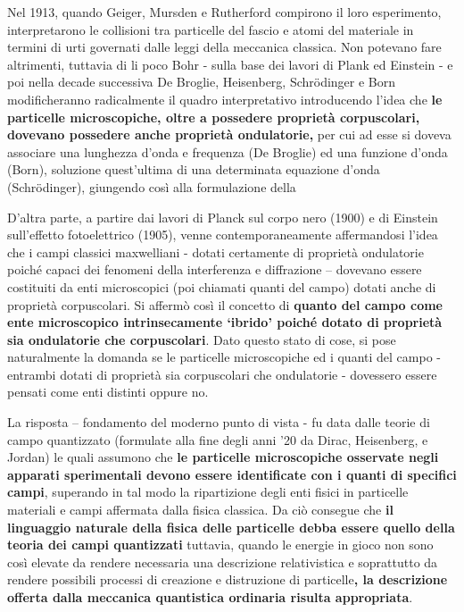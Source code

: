 Nel 1913, quando Geiger, Mursden e Rutherford compirono il loro
esperimento, interpretarono le collisioni tra particelle del fascio e
atomi del materiale in termini di urti governati dalle leggi della
meccanica classica.
Non potevano fare altrimenti, tuttavia di li poco
Bohr - sulla base dei lavori di Plank ed Einstein - e poi nella decade
successiva De Broglie, Heisenberg, Schrödinger e Born modificheranno
radicalmente il quadro interpretativo introducendo l'idea che \textbf{le
particelle microscopiche, oltre a possedere proprietà corpuscolari,
	dovevano possedere anche proprietà ondulatorie,} per cui ad esse si
doveva associare una lunghezza d'onda e frequenza (De Broglie) ed una
funzione d'onda (Born), soluzione quest'ultima di una determinata
equazione d'onda (Schrödinger), giungendo così alla formulazione della

D'altra parte, a partire dai lavori di Planck sul corpo nero (1900) e di
Einstein sull'effetto fotoelettrico (1905), venne contemporaneamente
affermandosi l'idea che i campi classici maxwelliani - dotati certamente
di proprietà ondulatorie poiché capaci dei fenomeni della interferenza e
diffrazione -- dovevano essere costituiti da enti microscopici (poi
chiamati quanti del campo) dotati anche di proprietà corpuscolari.
Si affermò così il concetto di \textbf{quanto del campo come ente
microscopico intrinsecamente `ibrido' poiché dotato di proprietà sia
ondulatorie che corpuscolari}.
Dato questo stato di cose, si pose naturalmente la domanda se le particelle microscopiche ed i quanti del campo - entrambi dotati di proprietà sia corpuscolari che ondulatorie - dovessero essere pensati come enti distinti oppure no.

La risposta -- fondamento del moderno punto di vista - fu data dalle
teorie di campo quantizzato (formulate alla fine degli anni '20 da
Dirac, Heisenberg, e Jordan) le quali assumono che \textbf{le particelle
microscopiche osservate negli apparati sperimentali devono essere
identificate con i quanti di specifici campi}, superando in tal modo la
ripartizione degli enti fisici in particelle materiali e campi affermata
dalla fisica classica.
Da ciò consegue che \textbf{il linguaggio
naturale della fisica delle particelle debba essere quello della teoria
dei campi quantizzati} tuttavia, quando le energie in gioco non sono
così elevate da rendere necessaria una descrizione relativistica e
soprattutto da rendere possibili processi di creazione e distruzione di
particelle\textbf{, la descrizione offerta dalla meccanica quantistica
ordinaria risulta appropriata}.

